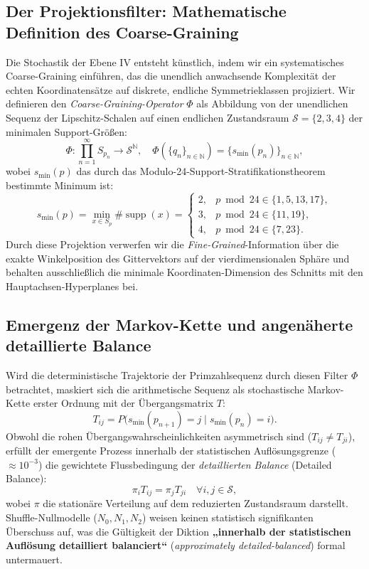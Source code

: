 \documentclass[11pt,a4paper]{article}
\theoremstyle{definition}
\begin{document}
	\subsection{Der Projektionsfilter: Mathematische Definition des Coarse-Graining}
	Die Stochastik der Ebene IV entsteht künstlich, indem wir ein systematisches Coarse-Graining einführen, das die unendlich anwachsende Komplexität der echten Koordinatensätze auf diskrete, endliche Symmetrieklassen projiziert. Wir definieren den \emph{Coarse-Graining-Operator} $\Phi$ als Abbildung von der unendlichen Sequenz der Lipschitz-Schalen auf einen endlichen Zustandsraum $\mathcal{S} = \{2, 3, 4\}$ der minimalen Support-Größen:
	\begin{equation}
		\Phi: \prod_{n=1}^{\infty} S_{p_n} \longrightarrow \mathcal{S}^{\mathbb{N}}, \quad \Phi\left( \{q_n\}_{n \in \mathbb{N}} \right) = \{s_{\min}(p_n)\}_{n \in \mathbb{N}},
	\end{equation}
	wobei $s_{\min}(p)$ das durch das Modulo-24-Support-Stratifikationstheorem bestimmte Minimum ist:
	\begin{equation}
		s_{\min}(p) = \min_{x \in S_p} \#\operatorname{supp}(x) = 
		\begin{cases} 
			2, & p \bmod 24 \in \{1, 5, 13, 17\}, \\ 
			3, & p \bmod 24 \in \{11, 19\}, \\ 
			4, & p \bmod 24 \in \{7, 23\}. 
		\end{cases}
	\end{equation}
	Durch diese Projektion verwerfen wir die \emph{Fine-Grained}-Information über die exakte Winkelposition des Gittervektors auf der vierdimensionalen Sphäre und behalten ausschließlich die minimale Koordinaten-Dimension des Schnitts mit den Hauptachsen-Hyperplanes bei.
	
	\subsection{Emergenz der Markov-Kette und angenäherte detaillierte Balance}
	Wird die deterministische Trajektorie der Primzahlsequenz durch diesen Filter $\Phi$ betrachtet, maskiert sich die arithmetische Sequenz als stochastische Markov-Kette erster Ordnung mit der Übergangsmatrix $T$:
	\begin{equation}
		T_{ij} = P\big(s_{\min}(p_{n+1}) = j \;\big|\; s_{\min}(p_n) = i\big).
	\end{equation}
	Obwohl die rohen Übergangswahrscheinlichkeiten asymmetrisch sind ($T_{ij} \neq T_{ji}$), erfüllt der emergente Prozess innerhalb der statistischen Auflösungsgrenze ($\approx 10^{-3}$) die gewichtete Flussbedingung der \emph{detaillierten Balance} (Detailed Balance):
	\begin{equation}
		\boxed{\pi_i T_{ij} = \pi_j T_{ji}} \quad \forall i,j \in \mathcal{S},
	\end{equation}
	wobei $\pi$ die stationäre Verteilung auf dem reduzierten Zustandsraum darstellt. Shuffle-Nullmodelle ($N_0, N_1, N_2$) weisen keinen statistisch signifikanten Überschuss auf, was die Gültigkeit der Diktion \textbf{„innerhalb der statistischen Auflösung detailliert balanciert“} (\emph{approximately detailed-balanced}) formal untermauert.
	
\end{document}
